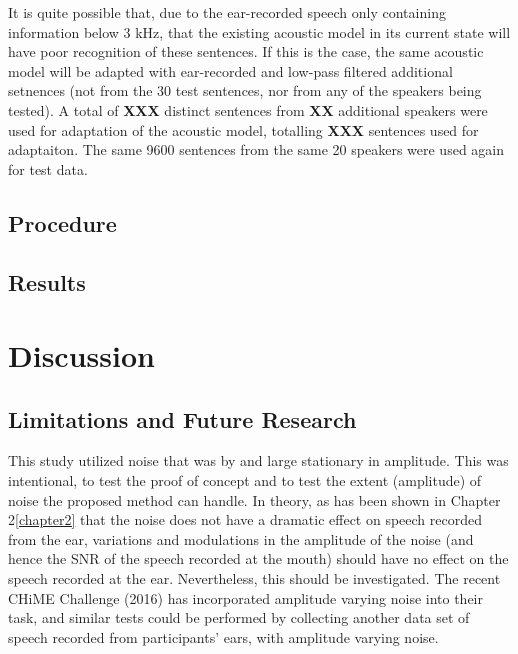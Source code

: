 \documentclass[dissertation,copyright]{uathesis}
\begin{document}
It is quite possible that, due to the ear-recorded speech only containing information below 3 kHz, that the existing acoustic model in its current state will have poor recognition of these sentences.  If this is the case, the same acoustic model will be adapted with ear-recorded and low-pass filtered additional setnences (not from the 30 test sentences, nor from any of the speakers being tested).  A total of \textbf{XXX} distinct sentences from \textbf{XX} additional speakers were used for adaptation of the acoustic model, totalling \textbf{XXX} sentences used for adaptaiton.  The same 9600 sentences from the same 20 speakers were used again for test data.

\subsection{Procedure}

\subsection{Results}

\section{Discussion}

\subsection{Limitations and Future Research}

This study utilized noise that was by and large stationary in amplitude.  This was intentional, to test the proof of concept and to test the extent (amplitude) of noise the proposed method can handle.  In theory, as has been shown in Chapter 2\ref{chapter2} that the noise does not have a dramatic effect on speech recorded from the ear, variations and modulations in the amplitude of the noise (and hence the SNR of the speech recorded at the mouth) should have no effect on the speech recorded at the ear.  Nevertheless, this should be investigated.  The recent CHiME Challenge (2016) has incorporated amplitude varying noise into their task, and similar tests could be performed by collecting another data set of speech recorded from participants' ears, with amplitude varying noise.






\end{document}

